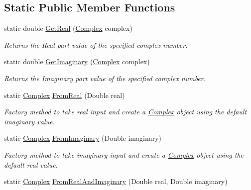 \subsection*{Static Public Member Functions}
\begin{DoxyCompactItemize}
\item 
static double \mbox{\hyperlink{struct_c_s_i_1_1_library_1_1_data_types_1_1_complex_a3609090c64694f12e1452ecab047f549}{Get\+Real}} (\mbox{\hyperlink{struct_c_s_i_1_1_library_1_1_data_types_1_1_complex}{Complex}} complex)
\begin{DoxyCompactList}\small\item\em Returns the Real part value of the specified complex number. \end{DoxyCompactList}\item 
static double \mbox{\hyperlink{struct_c_s_i_1_1_library_1_1_data_types_1_1_complex_a2abb82ed6e63bcaf14d937d9a8d2abc1}{Get\+Imaginary}} (\mbox{\hyperlink{struct_c_s_i_1_1_library_1_1_data_types_1_1_complex}{Complex}} complex)
\begin{DoxyCompactList}\small\item\em Returns the Imaginary part value of the specified complex number. \end{DoxyCompactList}\item 
static \mbox{\hyperlink{struct_c_s_i_1_1_library_1_1_data_types_1_1_complex}{Complex}} \mbox{\hyperlink{struct_c_s_i_1_1_library_1_1_data_types_1_1_complex_a78c4b457ae3aae0ca55c4df4ea2b09f3}{From\+Real}} (Double real)
\begin{DoxyCompactList}\small\item\em Factory method to take real input and create a \mbox{\hyperlink{struct_c_s_i_1_1_library_1_1_data_types_1_1_complex}{Complex}} object using the default imaginary value. \end{DoxyCompactList}\item 
static \mbox{\hyperlink{struct_c_s_i_1_1_library_1_1_data_types_1_1_complex}{Complex}} \mbox{\hyperlink{struct_c_s_i_1_1_library_1_1_data_types_1_1_complex_a993f2fc3375632789eb3cd6624edd17c}{From\+Imaginary}} (Double imaginary)
\begin{DoxyCompactList}\small\item\em Factory method to take imaginary input and create a \mbox{\hyperlink{struct_c_s_i_1_1_library_1_1_data_types_1_1_complex}{Complex}} object using the default real value. \end{DoxyCompactList}\item 
static \mbox{\hyperlink{struct_c_s_i_1_1_library_1_1_data_types_1_1_complex}{Complex}} \mbox{\hyperlink{struct_c_s_i_1_1_library_1_1_data_types_1_1_complex_a0d9aa503483d772359f287456ab59a5e}{From\+Real\+And\+Imaginary}} (Double real, Double imaginary)

\end{DoxyCompactItemize}
